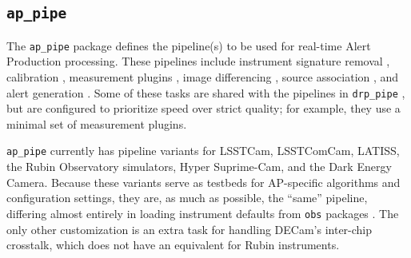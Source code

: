 \subsection{\texttt{ap\_pipe}}
\label{sec:ap_pipe}

The \texttt{ap\_pipe} package defines the pipeline(s) to be used for real-time Alert Production processing.
These pipelines include instrument signature removal , calibration , measurement plugins , image differencing , source association , and alert generation .
Some of these tasks are shared with the pipelines in \texttt{drp\_pipe} , but are configured to prioritize speed over strict quality; for example, they use a minimal set of measurement plugins.

\texttt{ap\_pipe} currently has pipeline variants for LSSTCam, LSSTComCam, LATISS, the Rubin Observatory simulators, Hyper Suprime-Cam, and the Dark Energy Camera.
Because these variants serve as testbeds for AP-specific algorithms and configuration settings, they are, as much as possible, the ``same'' pipeline, differing almost entirely in loading instrument defaults from \texttt{obs} packages .
The only other customization is an extra task for handling DECam's inter-chip crosstalk, which does not have an equivalent for Rubin instruments.
